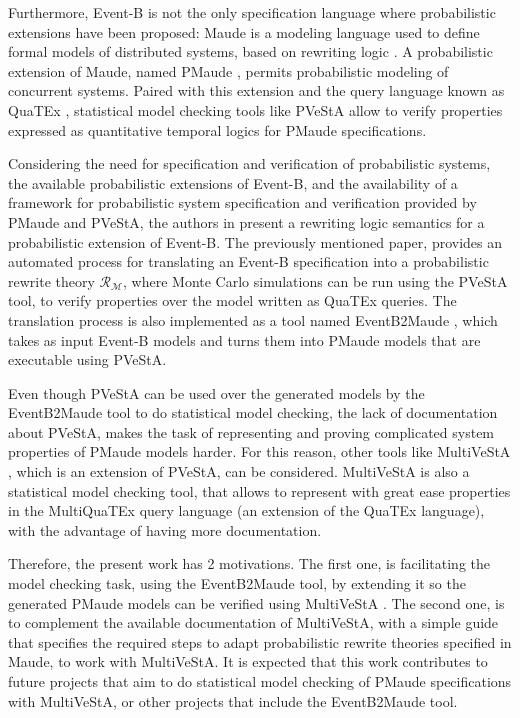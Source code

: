Furthermore, Event-B is not the only specification language where probabilistic extensions have been proposed: Maude \cite{Clavel2007} is a modeling language used to define formal models of distributed systems, based on rewriting logic \cite{Bruni2006}. A probabilistic extension of Maude, named PMaude \cite{Agha2006}, permits probabilistic modeling of concurrent systems. Paired with this extension and the query language known as QuaTEx \cite{Agha2006}, statistical model checking tools like PVeStA \cite{AlTurki2011} allow to verify properties expressed as quantitative temporal logics for PMaude specifications.

Considering the need for specification and verification of probabilistic systems, the available probabilistic extensions of Event-B, and the availability of a framework for probabilistic system specification and verification provided by PMaude and PVeStA,  the authors in \cite{Olarte} present a rewriting logic semantics for a probabilistic extension of Event-B. The previously mentioned paper, provides an automated process for translating an Event-B specification into a probabilistic rewrite theory $\mathscr{R}_\mathscr{M}$, where Monte Carlo simulations can be run using the PVeStA tool, to verify properties over the model written as QuaTEx queries. The translation process is also implemented as a tool named EventB2Maude \cite{tool.website}, which takes as input Event-B models and turns them into PMaude models that are executable using PVeStA.

Even though PVeStA can be used over the generated models by the EventB2Maude tool to do statistical model checking, the lack of documentation about PVeStA, makes the task of representing and proving complicated system properties of PMaude models harder. For this reason, other tools like MultiVeStA \cite{multivesta}, which is an extension of PVeStA, can be considered. MultiVeStA is also a statistical model checking tool, that allows to represent with great ease properties in the MultiQuaTEx query language \cite{multivesta} (an extension of the QuaTEx language), with the advantage of having more documentation. 

Therefore, the present work has 2 motivations. The first one, is facilitating the model checking task, using the EventB2Maude tool, by extending it so the generated PMaude models can be verified using MultiVeStA . The second one, is to complement the available documentation of MultiVeStA, with a simple guide that specifies the required steps to adapt probabilistic rewrite theories specified in Maude, to work with MultiVeStA. It is expected that this work contributes to future projects that aim to do statistical model checking of PMaude specifications with MultiVeStA, or other projects that include the EventB2Maude tool.


